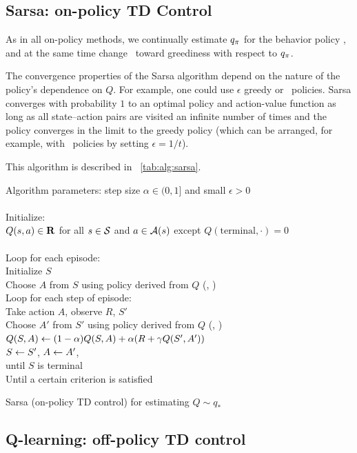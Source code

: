 \subsection{Sarsa: on-policy TD Control}

As in all on-policy methods,
we continually estimate $q_{\pi}$ for the behavior policy \pol,
and at the same time change \pol\ toward greediness with respect to $q_{\pi}$.

The convergence properties of the Sarsa algorithm depend on the nature of the policy’s dependence on $Q$.
For example, one could use $\epsilon$ greedy or \epssoft\ policies.
Sarsa converges with probability $1$ to an optimal policy and action-value function
as long as all state–action pairs are visited an infinite number of times
and the policy converges in the limit to the greedy policy
(which can be arranged, for example, with \epsgreedy\ policies by setting $\epsilon = 1 /t$).

This algorithm is described in \tablename~\ref{tab:alg:sarsa}.


\begin{table}
\beginalg
Algorithm parameters: step size $\alpha \in (0, 1]$ and small $\epsilon>0$\\
\\
Initialize:\\
\> $Q(s,a) \in \mathbf{R}$ for all $s\in\mathcal{S}$ and $a\in\mathcal{A}(s)$
    except $Q(\mathrm{terminal}, \cdot)=0$\\
\\
Loop for each episode:\\
\> Initialize $S$\\
\> Choose $A$ from $S$ using policy derived from $Q$ (\eg, \epsgreedy)\\
\> Loop for each step of episode:\\
\> \> Take action $A$, observe $R$, $S'$\\
\> \> Choose $A'$ from $S'$ using policy derived from $Q$ (\eg, \epsgreedy)\\
\> \> $Q(S,A) \leftarrow (1-\alpha) Q(S,A) + \alpha (R + \gamma Q(S',A'))$\\
\> \> $S \leftarrow S'$, $A \leftarrow A'$,\\
\> until $S$ is terminal\\
Until a certain criterion is satisfied
\endalg
\caption{Sarsa (on-policy TD control) for estimating $Q\sim q_\ast$}
\label{tab:alg:sarsa}
\end{table}


\subsection{Q-learning: off-policy TD control}

